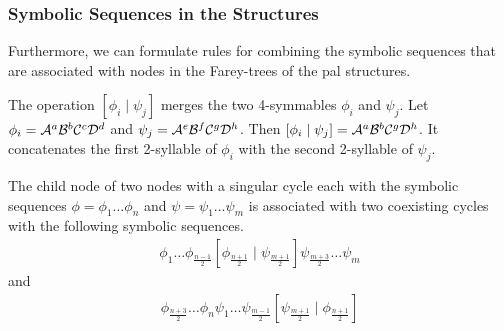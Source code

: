 \subsubsection{Symbolic Sequences in the  Structures}

Furthermore, we can formulate rules for combining the symbolic sequences that are associated with nodes in the Farey-trees of the \gls{pal} structures.

\begin{definition}
	The operation $\left[\phi_i \mid \psi_j\right]$ merges the two 4-symmables $\phi_i$ and $\psi_j$.
	Let $\phi_i = \mathcal{A}^a\mathcal{B}^b\mathcal{C}^c\mathcal{D}^d$ and $\psi_j = \mathcal{A}^e\mathcal{B}^f\mathcal{C}^g\mathcal{D}^h$.
	Then $\left[\phi_i \mid \psi_j\right] = \mathcal{A}^a\mathcal{B}^b\mathcal{C}^g\mathcal{D}^h$.
	It concatenates the first 2-syllable of $\phi_i$ with the second 2-syllable of $\psi_j$.
\end{definition}

\begin{theorem}
	The child node of two nodes with a singular cycle each with the symbolic sequences $\phi = \phi_1 \dots \phi_n$ and $\psi = \psi_1 \dots \psi_m$ is associated with two coexisting cycles with the following symbolic sequences.
	\begin{align}
		\phi_1 \dots \phi_{\frac{n-1}{2}} \left[\phi_{\frac{n+1}{2}} \mid \psi_{\frac{m+1}{2}}\right] \psi_{\frac{m+3}{2}} \dots \psi_m
	\end{align}
	and
	\begin{align}
		\phi_{\frac{n+3}{2}} \dots \phi_n \psi_1 \dots \psi_{\frac{m-1}{2}} \left[\psi_{\frac{m+1}{2}} \mid \phi_{\frac{n+1}{2}}\right]
	\end{align}
\end{theorem}

